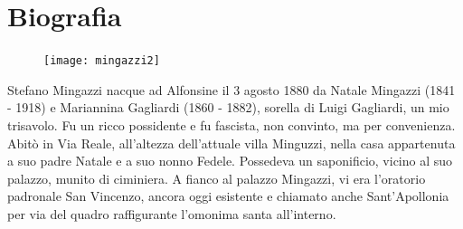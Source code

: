 \thispagestyle{empty}
\chapter*{Biografia}


\begin{figure} %
    \centering
    \vspace{-0.5cm}
    \texttt{[image: mingazzi2]}
    \vspace{-0.5cm}
\end{figure}
Stefano Mingazzi nacque ad Alfonsine il 3 agosto 1880 da Natale Mingazzi (1841 - 1918) e Mariannina Gagliardi (1860 - 1882), sorella di Luigi Gagliardi, un mio trisavolo. Fu un ricco possidente e fu fascista, non convinto, ma per convenienza. Abitò in Via Reale, all'altezza dell'attuale villa Minguzzi, nella casa appartenuta a suo padre Natale e a suo nonno Fedele. Possedeva un saponificio, vicino al suo palazzo, munito di ciminiera. A fianco al palazzo Mingazzi, vi era l'oratorio padronale San Vincenzo, ancora oggi esistente e chiamato anche Sant'Apollonia per via del quadro raffigurante l'omonima santa all'interno.

